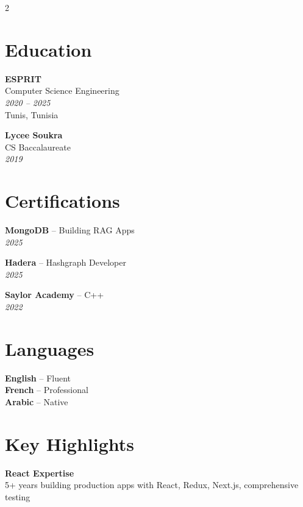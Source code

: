 \documentclass[10pt,a4paper]{article}
\begin{document}
\vspace{5pt}
\begin{multicols}{2}

\section*{Education}
\vspace{2pt}
{\small
\textbf{ESPRIT}\\[1pt]
Computer Science Engineering\\[1pt]
\textit{2020 -- 2025}\\[1pt]
Tunis, Tunisia

\vspace{4pt}
\textbf{Lycee Soukra}\\[1pt]
CS Baccalaureate\\[1pt]
\textit{2019}
}

\vspace{4pt}
\section*{Certifications}
\vspace{2pt}
{\small
\textbf{MongoDB} -- Building RAG Apps\\[1pt]
\textit{2025}

\vspace{2pt}
\textbf{Hadera} -- Hashgraph Developer\\[1pt]
\textit{2025}

\vspace{2pt}
\textbf{Saylor Academy} -- C++\\[1pt]
\textit{2022}
}

\columnbreak

\section*{Languages}
\vspace{2pt}
{\small
\textbf{English} -- Fluent\\[2pt]
\textbf{French} -- Professional\\[2pt]
\textbf{Arabic} -- Native
}

\vspace{4pt}
\section*{Key Highlights}
\vspace{2pt}
{\small
\textbf{React Expertise}\\[1pt]
5+ years building production apps with React, Redux, Next.js, comprehensive testing

}
\end{multicols}
\end{document}
